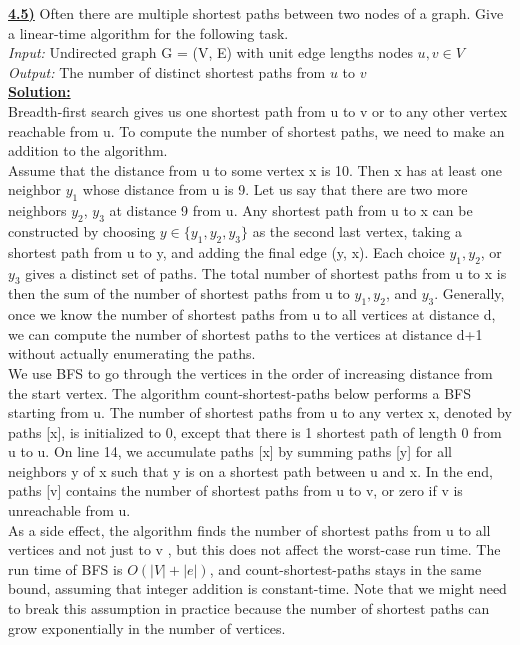 \documentclass{article}
\begin{document}
\vspace{.2in}
\noindent \textbf{\underline{4.5)}} Often there are multiple shortest paths between two nodes of a graph. Give a linear-time algorithm for the following task. \\

\indent \textit{Input:} Undirected graph G = (V, E) with unit edge lengths nodes $u, v \in V$ \\
\indent \textit{Output:} The number of distinct shortest paths from $u$ to $v$ \\

\noindent \textbf{\underline{Solution:}}  \\
\indent Breadth-first search gives us one shortest path from u to v or to any other vertex reachable from u. To compute the number of shortest paths, we need to make an addition to the algorithm. \\
Assume that the distance from u to some vertex x is 10.  Then x has at least one neighbor $y_1$ whose distance from u is 9.  Let us say that there are two more neighbors $y_2$, $y_3$ at distance 9 from u. Any shortest path from u to x can be constructed by choosing $y \in \{y_1, y_2, y_3\}$ as the second last vertex, taking a shortest path from u to y, and adding the final edge (y, x). Each choice $y_1, y_2$, or $y_3$ gives a distinct set of paths. The total number of shortest paths from u to x is then the sum of the number of shortest paths from u to $y_1, y_2$, and $y_3$. Generally, once we know the number of shortest paths from u to all vertices at distance d, we can compute the number of shortest paths to the vertices at distance d+1 without actually enumerating the paths. \\

We use BFS to go through the vertices in the order of increasing distance from the start vertex. The algorithm  count-shortest-paths below performs a BFS starting from u. The number of shortest paths from u to any vertex x, denoted by paths [x], is initialized to 0, except that there is 1 shortest path of length 0 from u to u. On line 14, we accumulate paths [x] by summing paths [y] for all neighbors y of x such that y is on a shortest path between u and x. In the end, paths [v] contains the number of shortest paths from u to v, or zero if v is unreachable from u. \\

As a side effect, the algorithm finds the number of shortest paths from u to all vertices and not just to v , but this does not affect the worst-case run time. The run time of BFS is $O(|V| + |e|)$, and count-shortest-paths stays in the same bound, assuming that integer addition is constant-time. Note that we might need to break this assumption in practice because the number of shortest paths can grow exponentially in the number of vertices. \\
\end{document}

